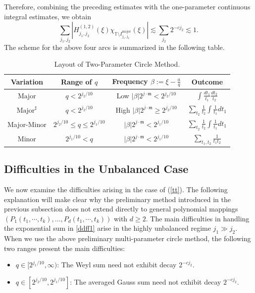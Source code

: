 \documentclass[10pt,a4paper]{amsart}
\numberwithin{equation}{section}
\begin{document}
Therefore, combining the preceding estimates with the one-parameter continuous integral estimates, we obtain
\[
\sum_{j_1,j_2}
\left|
H_{j_1,j_2}^{(1,2)}(\xi)
\chi_{\mathbb{T} \setminus I^{\mathrm{major}}_{j_1,j_2}}(\xi)
\right|
\lesssim
\sum_{j_2}2^{-cj_2}
\lesssim1.
\]
The scheme for  the above four arcs is summarized in the following
table.  \begin{table}[H]
	\centering
	\caption{Layout of Two-Parameter Circle Method.}
	\label{t2}
	\begin{tabular}{c|c|c|c}
		\noalign{\smallskip}\noalign{\smallskip}
		\hline\hline
		Variation& Range of $q$ & Frequency $\beta:=\xi-\frac{a}{q} $ &Outcome \\
		\hline
		$\text{Major}$  & $ q<2^{ j_2/10} $ & Low $|\beta|2^{j\cdot \mathfrak{m}}<2^{ j_2/10} $ & $\int \frac{dt_1}{t_1}\frac{dt_2}{t_2} $\\
		\hline
		$\text{Major}^{\sharp}$&$q<2^{ j_2/10} $  &High $| \beta|2^{j\cdot \mathfrak{m}}\ge 2^{ j_2/10} $ & $\sum_{t_2}\frac{1}{t_2} \int \frac{1}{t_1}dt_1$ \\
		\hline
		Major-Minor & $2^{ j_2/10}\le q\le 2^{j_1/10} $ & $|\beta|2^{j\cdot \mathfrak{m}}<2^{j_1/10}$ &$\sum_{t_2}\frac{1}{t_2}\int \frac{1}{t_1}dt_1 $ \\
		\hline
		Minor &  $2^{j_1/10}  <q$ & $|\beta|2^{j\cdot \mathfrak{m}}<2^{j_1/10}$ &$\sum_{t_1,t_2} \frac{1}{t_1t_2} $\\
		\hline
		\hline
	\end{tabular}
\end{table} 







\subsection{Difficulties in the Unbalanced Case}\label{sec340}
We now examine the difficulties arising in the case of (\ref{tt}). The following explanation will make clear why the preliminary method introduced in the previous subsection does not extend directly to general polynomial mappings $(P_1(t_1,\cdots,t_k),\ldots,P_d(t_1,\cdots,t_k))$  with $d\ge 2$.   The main difficulties in handling the exponential sum in
\eqref{ddff1} arise in the highly unbalanced regime
$j_1\gg j_2$.  When we use the above preliminary multi-parameter circle method, the following two ranges present the main difficulties:
\begin{itemize}
	\item[(i)] $q \in [2^{j_1/10},\infty)$:  
	The Weyl sum need not exhibit decay $2^{-c j_2}$.
	
	\item[(ii)] $q \in [2^{j_2/10}, 2^{j_1/10}]$:  
	The averaged Gauss sum need not exhibit decay  $2^{-c j_2}$.
\end{itemize}
\end{document}
